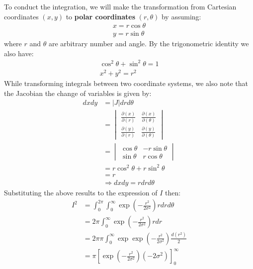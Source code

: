 \documentclass[a4paper, 10pt]{article}  %
\begin{document}
\begin{enumerate}[label=\textbf{(\alph*)}]
    To conduct the integration, we will make the transformation from Cartesian coordinates $(x, y)$ to \textbf{polar coordinates} $(r, \theta)$ by assuming:
    \begin{align*}
        x = r \cos \theta \\
        y = r \sin \theta
    \end{align*}
    where $r$ and $\theta$ are arbitrary number and angle. By the trigonometric identity we also have:
    \begin{align*}
        \cos^2 \theta + \sin^2 \theta = 1 \\
        x^2 + y^2 = r^2
    \end{align*}
    While transforming integrals between two coordinate systems, we also note that the Jacobian the change of variables is given by:
    \begin{align*}
        dx dy &= |J| dr d\theta\\
        &= 
        \begin{vmatrix}
        \displaystyle{\frac{\partial (x)}{\partial (r)}} & \displaystyle{\frac{\partial (x)}{\partial (\theta)}}\\ 
        \displaystyle{\frac{\partial (y)}{\partial (r)}} & 
        \displaystyle{\frac{\partial (y)}{\partial (\theta)}}
        \end{vmatrix} \\
        &=
        \begin{vmatrix}
        \cos \theta & -r \sin \theta \\
        \sin \theta & r \cos \theta
        \end{vmatrix} \\
        &= r \cos^2 \theta + r \sin^2 \theta \\
        &= r \\
        & \Longrightarrow dxdy = r dr d\theta
    \end{align*}
    Substituting the above results to the expression of $I$ then:
    \begin{align*}
        I^2 &= \int_0^{2 \pi} \int_0^\infty \exp \left( -\frac{r^2}{2 \sigma^2} \right) r dr d\theta \\
        &= 2 \pi \int_0^\infty \exp \left( -\frac{r^2}{2 \sigma^2} \right) r dr \\
        &= 2 \pi \pi \int_0^\infty \exp \exp \left( -\frac{r^2}{2 \sigma^2} \right) \frac{d(r^2)}{2} \\
        &= \pi \left[ \exp \left(- \frac{r^2}{2 \sigma^2} \right) (-2 \sigma^2) \right]_0^\infty \\

\end{align*}
\end{enumerate}
\end{document}
